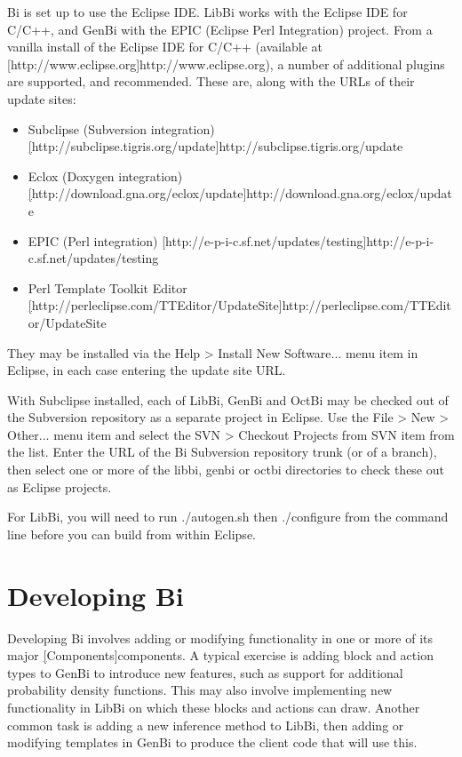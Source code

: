 Bi is set up to use the Eclipse IDE. LibBi works with the Eclipse IDE for
C/C++, and GenBi with the EPIC (Eclipse Perl Integration) project. From a
vanilla install of the Eclipse IDE for C/C++ (available at
\hyperref[hyper][http://www.eclipse.org]{http://www.eclipse.org}), a number of
additional plugins are supported, and recommended. These are, along with the
URLs of their update sites:
\begin{itemize}
\item Subclipse (Subversion integration) \hyperref[hyper][http://subclipse.tigris.org/update]{http://subclipse.tigris.org/update}

\item Eclox (Doxygen integration) \hyperref[hyper][http://download.gna.org/eclox/update]{http://download.gna.org/eclox/update}

\item EPIC (Perl integration) \hyperref[hyper][http://e-p-i-c.sf.net/updates/testing]{http://e-p-i-c.sf.net/updates/testing}

\item Perl Template Toolkit Editor \hyperref[hyper][http://perleclipse.com/TTEditor/UpdateSite]{http://perleclipse.com/TTEditor/UpdateSite}
\end{itemize}
They may be installed via the \textsf{Help > Install New Software...} menu
item in Eclipse, in each case entering the update site URL.

With Subclipse installed, each of LibBi, GenBi and OctBi may be checked out of
the Subversion repository as a separate project in Eclipse. Use the
\textsf{File > New > Other...} menu item and select the \textsf{SVN > Checkout
  Projects from SVN} item from the list. Enter the URL of the Bi Subversion
repository trunk (or of a branch), then select one or more of the
\textsf{libbi}, \textsf{genbi} or \textsf{octbi} directories to check these
out as Eclipse projects.

For LibBi, you will need to run \textsf{./autogen.sh} then
\textsf{./configure} from the command line before you can build from within
Eclipse.


\section{Developing Bi}

Developing Bi involves adding or modifying functionality in one or more of its
major \hyperref[hyper][Components]{components}. A typical exercise is adding
block and action types to GenBi to introduce new features, such as support for
additional probability density functions. This may also involve implementing
new functionality in LibBi on which these blocks and actions can draw. Another
common task is adding a new inference method to LibBi, then adding or
modifying templates in GenBi to produce the client code that will use this.

